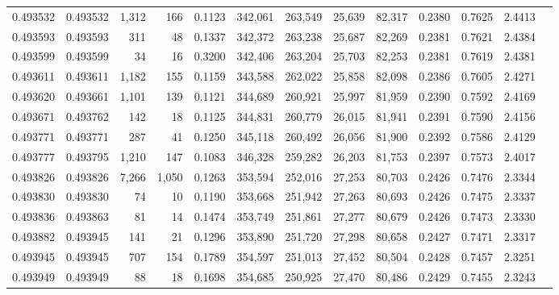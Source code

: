 \begin{tabular}{rrrrrrrrrrrrr}
0.493532 & 0.493532 & 1,312 &   166 &                                     0.1123 & 342,061 & 263,549 &  25,639 &  82,317 & 0.2380 & 0.7625 & 2.4413 \\
0.493593 & 0.493593 &   311 &    48 &                                     0.1337 & 342,372 & 263,238 &  25,687 &  82,269 & 0.2381 & 0.7621 & 2.4384 \\
0.493599 & 0.493599 &    34 &    16 &                                     0.3200 & 342,406 & 263,204 &  25,703 &  82,253 & 0.2381 & 0.7619 & 2.4381 \\
0.493611 & 0.493611 & 1,182 &   155 &                                     0.1159 & 343,588 & 262,022 &  25,858 &  82,098 & 0.2386 & 0.7605 & 2.4271 \\
0.493620 & 0.493661 & 1,101 &   139 &                                     0.1121 & 344,689 & 260,921 &  25,997 &  81,959 & 0.2390 & 0.7592 & 2.4169 \\
0.493671 & 0.493762 &   142 &    18 &                                     0.1125 & 344,831 & 260,779 &  26,015 &  81,941 & 0.2391 & 0.7590 & 2.4156 \\
0.493771 & 0.493771 &   287 &    41 &                                     0.1250 & 345,118 & 260,492 &  26,056 &  81,900 & 0.2392 & 0.7586 & 2.4129 \\
0.493777 & 0.493795 & 1,210 &   147 &                                     0.1083 & 346,328 & 259,282 &  26,203 &  81,753 & 0.2397 & 0.7573 & 2.4017 \\
0.493826 & 0.493826 & 7,266 & 1,050 &                                     0.1263 & 353,594 & 252,016 &  27,253 &  80,703 & 0.2426 & 0.7476 & 2.3344 \\
0.493830 & 0.493830 &    74 &    10 &                                     0.1190 & 353,668 & 251,942 &  27,263 &  80,693 & 0.2426 & 0.7475 & 2.3337 \\
0.493836 & 0.493863 &    81 &    14 &                                     0.1474 & 353,749 & 251,861 &  27,277 &  80,679 & 0.2426 & 0.7473 & 2.3330 \\
0.493882 & 0.493945 &   141 &    21 &                                     0.1296 & 353,890 & 251,720 &  27,298 &  80,658 & 0.2427 & 0.7471 & 2.3317 \\
0.493945 & 0.493945 &   707 &   154 &                                     0.1789 & 354,597 & 251,013 &  27,452 &  80,504 & 0.2428 & 0.7457 & 2.3251 \\
0.493949 & 0.493949 &    88 &    18 &                                     0.1698 & 354,685 & 250,925 &  27,470 &  80,486 & 0.2429 & 0.7455 & 2.3243 \\

\end{tabular}
